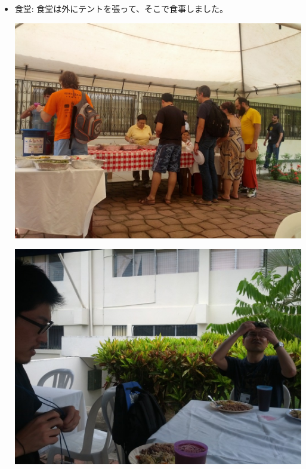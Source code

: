 \documentclass[mingoth,a4paper]{jsarticle}
\begin{document}
\begin{itemize}
 \item 食堂: 食堂は外にテントを張って、そこで食事しました。\\
	\begin{minipage}{0.4\hsize}
	\includegraphics[width=0.8\hsize]{image201208/debconf12_diningroom01.jpg}
	\end{minipage}
	\begin{minipage}{0.4\hsize}
	\includegraphics[width=0.8\hsize]{image201208/debconf12_diningroom02.jpg}
	\end{minipage}



\end{itemize}
\end{document}

